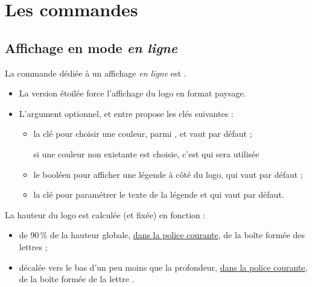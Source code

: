\documentclass[french,11pt,a4paper]{article}
\begin{document}
\pagebreak

\section{Les commandes}

\subsection{Affichage en mode \textit{en ligne}}

La commande dédiée à un affichage \textit{en ligne} est .

\medskip

\begin{itemize}[leftmargin=*]
	\item La version étoilée force l'affichage du logo en format paysage.
	\item L'argument optionnel, et entre \MontreCode{[...]} propose les clés suivantes :
	\begin{itemize}
		\item la clé  pour choisir une couleur, parmi , et vaut  par défaut ;
		
		\hfill{\footnotesize si une couleur non existante est choisie, c'est  qui sera utilisée}
		\item le booléen  pour afficher une légende à côté du logo, qui vaut  par défaut ;
		\item la clé  pour paramétrer le texte de la légende et qui vaut  par défaut.
	\end{itemize}
\end{itemize}

\medskip

La hauteur du logo est calculée (et fixée) en fonction :

\begin{itemize}
	\item de 90\,\% de la hauteur globale, \underline{dans la police courante}, de la boîte formée des lettres  ;
	\item décalée vers le bas d'un peu moins que la profondeur, \underline{dans la police courante}, de la boîte formée de la lettre .
\end{itemize}

\medskip
\end{document}
